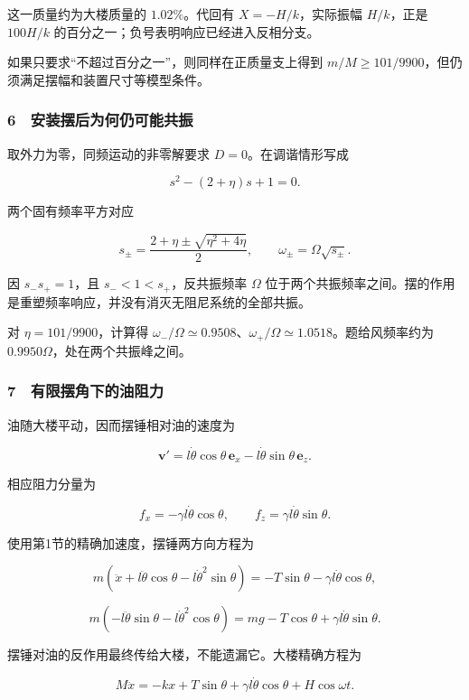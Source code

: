 \documentclass[12pt,a4paper,fontset=fandol]{ctexart}
\begin{document}
这一质量约为大楼质量的 \(1.02\%\)。代回有 \(X=-H/k\)，实际振幅
\(H/k\)，正是 \(100H/k\) 的百分之一；负号表明响应已经进入反相分支。

如果只要求``不超过百分之一''，则同样在正质量支上得到
\(m/M\ge101/9900\)，但仍须满足摆幅和装置尺寸等模型条件。

\subsubsection{6　安装摆后为何仍可能共振}\label{ux5b89ux88c5ux6446ux540eux4e3aux4f55ux4ecdux53efux80fdux5171ux632f}

取外力为零，同频运动的非零解要求 \(D=0\)。在调谐情形写成

\[s^2-(2+\eta)s+1=0.\]

两个固有频率平方对应

\[\boxed{s_\pm=
\frac{2+\eta\pm\sqrt{\eta^2+4\eta}}2,
\qquad \omega_\pm=\Omega\sqrt{s_\pm}.}\]

因 \(s_-s_+=1\)，且 \(s_-<1<s_+\)，反共振频率 \(\Omega\)
位于两个共振频率之间。摆的作用是重塑频率响应，并没有消灭无阻尼系统的全部共振。

对 \(\eta=101/9900\)，计算得
\(\omega_-/\Omega\simeq0.9508\)、\(\omega_+/\Omega\simeq1.0518\)。题给风频率约为
\(0.9950\Omega\)，处在两个共振峰之间。

\subsubsection{7　有限摆角下的油阻力}\label{ux6709ux9650ux6446ux89d2ux4e0bux7684ux6cb9ux963bux529b}

油随大楼平动，因而摆锤相对油的速度为

\[\boldsymbol v'
=l\dot\theta\cos\theta\,\boldsymbol e_x
-l\dot\theta\sin\theta\,\boldsymbol e_z.\]

相应阻力分量为

\[f_x=-\gamma l\dot\theta\cos\theta,
\qquad f_z=\gamma l\dot\theta\sin\theta.\]

使用第1节的精确加速度，摆锤两方向方程为

\[m(\ddot x+l\ddot\theta\cos\theta-l\dot\theta^2\sin\theta)
=-T\sin\theta-\gamma l\dot\theta\cos\theta,\]

\[m(-l\ddot\theta\sin\theta-l\dot\theta^2\cos\theta)
=mg-T\cos\theta+\gamma l\dot\theta\sin\theta.\]

摆锤对油的反作用最终传给大楼，不能遗漏它。大楼精确方程为

\[\boxed{M\ddot x=-kx+T\sin\theta
+\gamma l\dot\theta\cos\theta+H\cos\omega t.}\]
\end{document}

